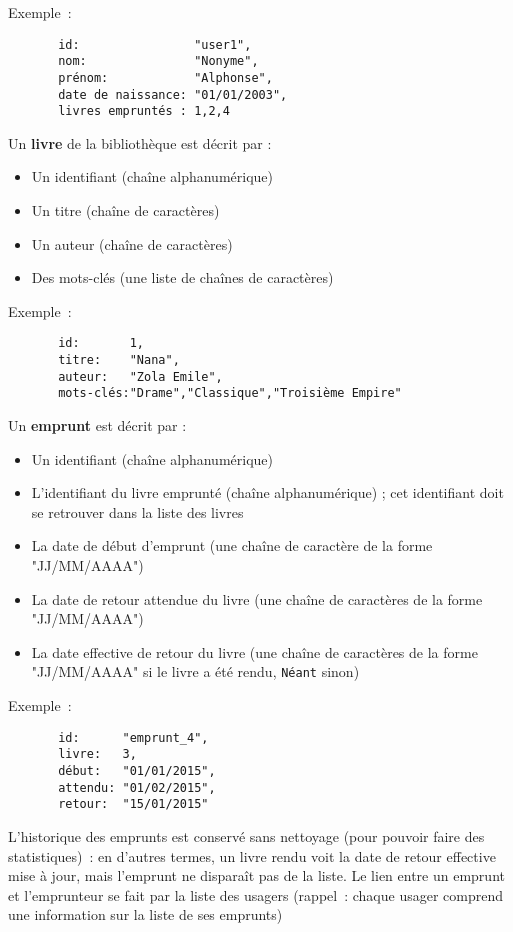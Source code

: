 \documentclass[10pt,a4paper]{sujets-exercices}
\begin{document}
Exemple~:
{\small
\begin{verbatim}
       id:                "user1", 
       nom:               "Nonyme", 
       prénom:            "Alphonse", 
       date de naissance: "01/01/2003", 
       livres empruntés : 1,2,4
\end{verbatim}
}


Un \textbf{livre} de la bibliothèque est décrit par : 

\begin{itemize}
\item Un identifiant (chaîne alphanumérique)
\item Un titre (chaîne de caractères)
\item Un auteur (chaîne de caractères)
\item Des mots-clés (une liste de chaînes de caractères)
\end{itemize}

Exemple~:
{\small
\begin{verbatim}
       id:       1,
       titre:    "Nana",
       auteur:   "Zola Emile",
       mots-clés:"Drame","Classique","Troisième Empire"
\end{verbatim}
}

Un \textbf{emprunt} est décrit par :

\begin{itemize}
\item Un identifiant (chaîne alphanumérique)
\item L'identifiant du livre emprunté (chaîne alphanumérique) ; cet identifiant doit se retrouver dans la liste des livres
\item La date de début d'emprunt (une chaîne de caractère de la forme "JJ/MM/AAAA")
\item La date de retour attendue du livre (une chaîne de caractères de la forme "JJ/MM/AAAA")
\item La date effective de retour du livre (une chaîne de caractères de la forme "JJ/MM/AAAA" si le livre a été rendu, \texttt{Néant} sinon)
\end{itemize}

Exemple~:
{\small
\begin{verbatim}
       id:      "emprunt_4",
       livre:   3,
       début:   "01/01/2015",
       attendu: "01/02/2015",
       retour:  "15/01/2015"
\end{verbatim}
}

L'historique des emprunts est conservé sans nettoyage (pour pouvoir faire des statistiques)~: en d'autres termes, un livre rendu voit la date de retour effective mise à jour, mais l'emprunt ne disparaît pas de la liste. Le lien entre un emprunt et l'emprunteur se fait par la liste des usagers (rappel~: chaque usager comprend une information sur la liste de ses emprunts)
\end{document}
